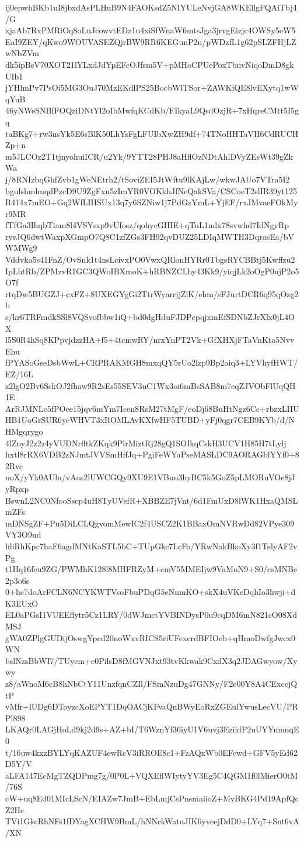 ij0epwhBKb1uI8jbxdAsPLHuB9N4FAOKsdZ5NIYULeNvjGA8WKEllgFQAiTbj4/G
xjaAb7RxPMRiOq8oLuJcowvtEDz1u4xiSfWnaW6mtsJga3jrvgEizjc4OWSy5eW5
EaI9ZEY/qKwo9WOUVASEZQjrBW9RR6KEGunP2u/pWDzfL1g62pSLZFHjLZwNbZVm
dk5ipBsV70XOT21lYLxdJdYpEFcOJfsm5V+pMHoCPUePoxTbnvNiqoDmD8gkUIb1
jYHlmPv7PsOi5MG3OuJ70MzEKdlPS25BocbWlTSor+ZAWKiQE8lvEXytq1wWqYuB
46yNWeSNBfFOQziDNtYl2oIbMwfqKCdKb/FIkyaL9QsdOzjR+7xHqreCMtt5I5gq
taBKg7+rw3nsYk5E6sBlK50LhYsFgLFUIbXwZH9df+74TNoHHTaVH6CdRUCHZp+n
m5JLCOz2T1tjnyohuiICR/u2Yk/9YTT28PHJ8aHflOzNDtAhlDVyZEsWt39gZkWa
j/8RNIzbqGhfZvb1gWeNEtrh2/tSoviZEI5JtWftu9lKAjLw/wkwJAUo7VTra5I2
bgulshmlmqdPzcD9U9ZgFxu5zImYR0VOKkhJfNeQakSVa/CSCoeT2slIR39yt125
R414x7mEO+Gq2WfLIHSUx13q7y6SZNiw1j7PdGzYmL+YjEF/rxJMvaeFOkMyr9MR
fTfGa3IhqbTiam8l4VSYsxp9vUfosz/qohycGHIE+qTuL1mlx78svwhd7IdNgyRp
ryrJQ6dwtWaxpXGmpO7Q8C1zfZGs3FH92qvDUZ25LDIqMWTH3DqrasEa/bVWMWg9
Vddvka5s41FnZ/OvSnk1t4nsLcivxPO0VwxQRlonHYRr0TbgsRYCBBtj5Kwffzu2
IpLhtRb/ZPMzvR1GC3QWoIBXmoK+hRBNZCLhy43Kk9/yiqjLk2oOgP0ujP2o5O7f
rtqDw5BUGZJ+cxFZ+8UXEGYgGi2TtrWyarrjjZiK/ehm/sFJurtDCR6q95qOzg2b
s/kr6TRFmdkSSl8VQSvofbbw1iQ+bd0dgHduFJDPcpqjxmEfSDNbZJrXlx0jL4OX
l5S0R4hSq8KPpvjdzzHA+f5+4tcmwRY/nrxYnPT2Vk+GfXHXjFTaVnKta5NvvEhu
fPYASoGseDsbWwL+CRPRAKMGH8mxqQY5rUo2lzp9Bp2aiq3+LYVhyfHWT/EZ/16L
z2lgO2Bv6SskOJ2fhaw9R2sEs55SEV3uC1Wx3oi6mBsSAB8m7eqZJVObFlUqQH1E
ArRJMNLc5fPOee15jqv6mYm7Icen8RsM27tMgF/eoDj68BuHtNgz6Cc+rbzxLIIU
HB1UoGrSUR6yeWHVT3xROMLAvKXfwHF5TUBD+yFj0qgr7CEB9KYb/d/NHMgqrygo
4lZnyJ2z2z4yVUDNrfltkZKqk9PlrMiztRj28gQ1SOIkqCskH3UCV1H85H7tLylj
hxtl8rRX6VDB2zNJmtJVVSmHffJq+PgiFeWYaPseMASLDC9AORAGblYYf0+82Rvc
noX/yYk0AUln/vAas2lUWCGQy9XU9E1VBuu3hyBC5k5GoZ5pLMORuVOe8jJyRpxp
BswnL2NC0NfooSscp4uH8TyUVefR+XBBZE7jVnt/6d1FmUxD8lWK1HxaQMSLmZFs
mDNSgZF+Pu5DiLCLQgvomMewIC2f4USCZ2K1BBaxOmNVRwDd82VPye309VY3O9ud
hliRhKpc7haF6agdMNtKaSTL5bC+TUpGkc7LcFo/YRwNakBkoXy3f1TelyAF2vPg
t1Hq16feu9ZG/PWMhK128l8MHFRZyM+cmV5MMEIjw9VaMnN9+S0/csMNBe2p3o6s
0+hc7doArFCLN6NCYKWTVsoFbuPDqG5eNnmKO+skX4uVKcDqhIo3hwji+dK3EUxO
EL0aPGsI1VUEEflytr5Cz1LRY/0dWJmctYVBINDysP0u9cqDM6mN821cO08XdMSJ
gWA0ZPlgGUDijOswgYpcd20noWxvRICS5riUFexcrdBFIOeb+qHmoDwfgJwcx0WN
bslNzsBbWI7/TUyem+c0PilsD8fMGVNJxt93tvKkwak9CxdX3q2JDAGwyow/Xywy
z8/aWnoM6cB8hNbCtY11UnzfqnCZIl/FSmNzuDg47GNNy/F2e00Y8A4CExccjQtP
vMfr+lUDg6DToyzcXoEPYT1DqOACjKFvaQnBWyEoRxZGEulYwusLecVU/PRPl898
LKAQr0LAGjHoLd9kj2d9s+AZ+bI/T6WznYf36iyU1V6uvj3EzikfF2uUYYnmnqE0
t/16uw4kxzBYLYqKAZUF4ewRcV3iRROE8c1+FzAQxWb0EFcwd+GFV5yEd62D5Y/V
aLFA147EcMgTZQDPmg7g/0P0L+VQXEflWIytyYV3Eg5C4QGM1f0lMierO0tM/76S
cW+uq8Ed01MIcLScN/EIAZw7JmB+EbLmjCsPnsmaiioZ+MvBKG4Pd19ApfQcZ2Hc
TVi1GkcRhNFs1fDYagXCHW9BmL/hNNckWatuJIK6yveejDdD0+LYq7+Snt6vA/XN
